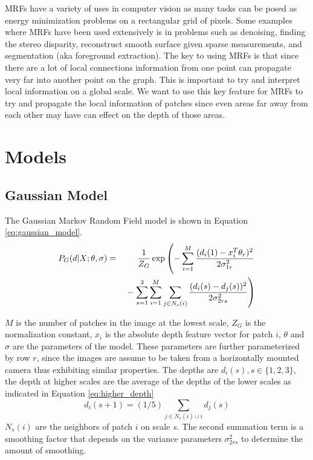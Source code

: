 \documentclass[journal]{IEEEtran}
\begin{document}
MRFs have a variety of uses in computer vision as many tasks can be posed as energy minimization problems on a rectangular grid of pixels. Some examples where MRFs have been used extensively is in problems such as denoising, finding the stereo disparity, reconstruct smooth surface given sparse measurements, and segmentation (aka foreground extraction). The key to using MRFs is that since there are a lot of local connections information from one point can propagate very far into another point on the graph. This is important to try and interpret local information on a global scale. We want to use this key feature for MRFs to try and propagate the local information of patches since even areas far away from each other may have can effect on the depth of those areas.
\section{Models}

\subsection{Gaussian Model}
The Gaussian Markov Random Field model is shown in Equation \ref{eq:gaussian_model}.
\setlength{\arraycolsep}{0.0em}
\begin{eqnarray}
\label{eq:gaussian_model}
P_G(d|X; \theta, \sigma) &{}={}& \frac{1}{Z_G}\exp\left(-\sum_{i=1}^{M}\frac{(d_i(1)-x_i^T\theta_r)^2}{2\sigma^2_{1r}} \vphantom{\sum_{j \in N_s(i)}}\right.\nonumber\\
&&- \left.\sum_{s=1}^3\sum_{i=1}^M\sum_{j \in N_s(i)} \frac{(d_i(s)-d_j(s))^2}{2\sigma_{2rs}^2}\right)
\end{eqnarray}
\setlength{\arraycolsep}{0.0em}

$M$ is the number of patches in the image at the lowest scale, $Z_G$ is the normalization constant, $x_i$ is the absolute depth feature vector for patch $i$, $\theta$ and $\sigma$ are the parameters of the model. These parameters are further parameterized by row $r$, since the images are assume to be taken from a horizontally mounted camera thus exhibiting similar properties. The depths are $d_i(s), s \in \{1, 2, 3\}$, the depth at higher scales are the average of the depths of the lower scales as indicated in Equation \ref{eq:higher_depth}
\begin{equation}
\label{eq:higher_depth}
d_i(s+1) = (1/5)\sum_{j \in N_s(i) \cup {i}} d_j(s)
\end{equation}
$N_s(i)$ are the neighbors of patch $i$ on scale $s$. The second summation term is a smoothing factor that depends on the variance parameters $\sigma_{2rs}^2$ to determine the amount of smoothing.
\end{document}
